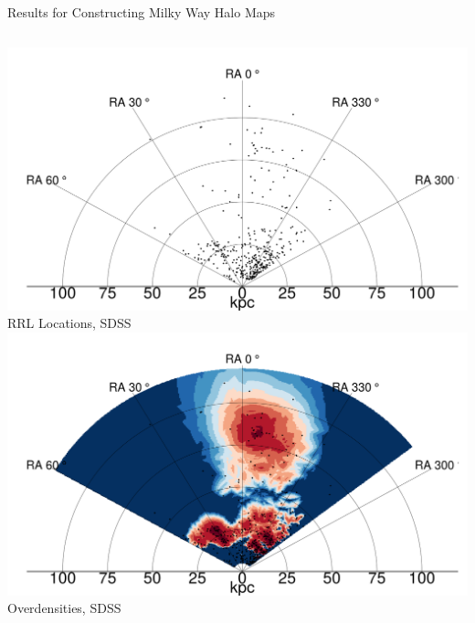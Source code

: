 \documentclass[12pt]{beamer}
\begin{document}
\begin{frame}{Results for Constructing Milky Way Halo Maps}
  \def \tw {.1}
  
  \begin{columns}
    \begin{column}{0.5\textwidth}
      \begin{center}
        \includegraphics[scale=\tw]{figs/density_true_points.png}\\
        RRL Locations, SDSS\\
        \includegraphics[scale=\tw]{figs/density_true.png}\\
        Overdensities, SDSS
      \end{center}
  \end{column}


\end{columns}
\end{frame}
\end{document}
